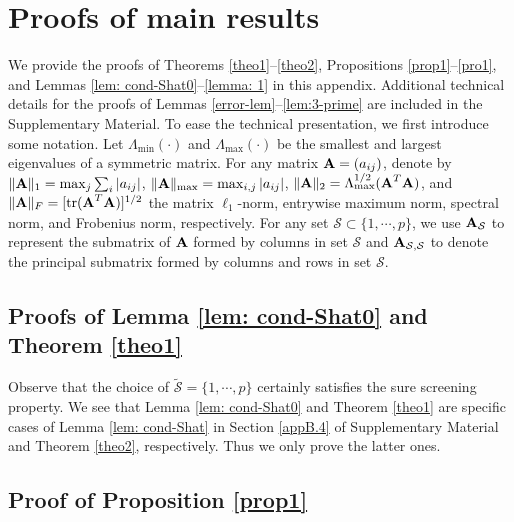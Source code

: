 \documentclass[11pt]{article}
\newcommand{\bx}{\mbox{\bf x}}
\newcommand{\bA}{\mbox{\bf A}}
\newcommand{\wt}{\widetilde}
\newcommand{\tr}{\mathrm{tr}}
\begin{document}
\appendix
\section{Proofs of main results} \label{appA}

We provide the proofs of Theorems \ref{theo1}--\ref{theo2}, Propositions \ref{prop1}--\ref{pro1}, and Lemmas \ref{lem: cond-Shat0}--\ref{lemma: 1} in this appendix. Additional technical details for the proofs of Lemmas \ref{error-lem}--\ref{lem:3-prime} are included in the Supplementary Material. To ease the technical presentation, we first introduce some notation.
Let $\Lambda_{\min}(\cdot)$ and $\Lambda_{\max}(\cdot)$ be the smallest and largest eigenvalues of a symmetric matrix. For any matrix $\bA = (a_{ij})$, denote by $\|\bA\|_1 = \max_{j}\sum_{i} |a_{ij}|$, $\|\bA\|_{\max}= \max_{i,j}|a_{ij}|$, $\|\bA\|_2=\Lambda_{\max}^{1/2}(\bA^T \bA)$, and $\|\bA\|_F = [\tr(\bA^T \bA)]^{1/2}$ the matrix $\ell_1$-norm, entrywise maximum norm, spectral norm, and Frobenius norm, respectively. For any set $\mathcal{S} \subset \{1,\cdots, p\}$, we use $\bA_{\mathcal S}$ to represent the submatrix of $\bA$ formed by columns in set $\mathcal{S}$ and $\bA_{\mathcal{S},\mathcal{S}}$ to denote the principal submatrix formed by columns and rows in set $\mathcal{S}$.

\subsection{Proofs of Lemma \ref{lem: cond-Shat0} and Theorem \ref{theo1}} \label{appA.1}

Observe that the choice of $\wt{\mathcal{S}} = \{1, \cdots, p\}$ certainly satisfies the sure screening property. We see that Lemma \ref{lem: cond-Shat0} and Theorem \ref{theo1} are specific cases of Lemma \ref{lem: cond-Shat} in Section \ref{appB.4} of Supplementary Material and Theorem \ref{theo2}, respectively. Thus we only prove the latter ones.

\subsection{Proof of Proposition \ref{prop1}} \label{appA.2}
\end{document}
